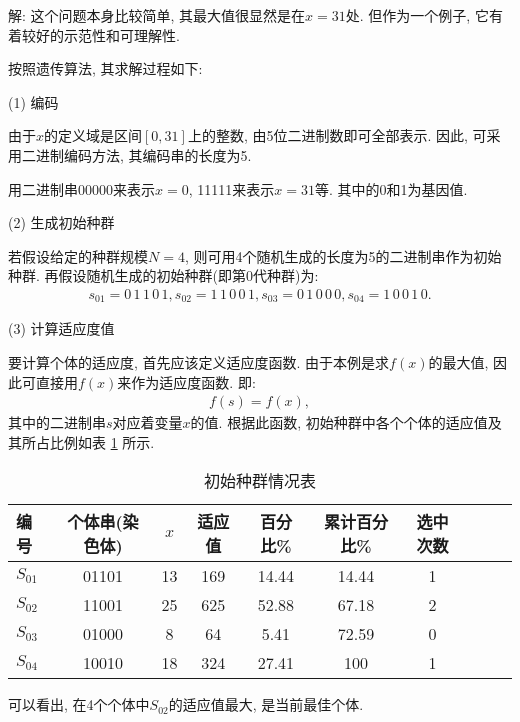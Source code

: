 解: 这个问题本身比较简单, 其最大值很显然是在$x=31$处. 但作为一个例子, 它有着较好的示范性和可理解性.

按照遗传算法, 其求解过程如下:

    (1) 编码

    由于$x$的定义域是区间$[0,31]$上的整数, 由5位二进制数即可全部表示. 因此, 可采用二进制编码方法, 其编码串的长度为5.

    \begin{example}
        用二进制串00000来表示$x=0$, 11111来表示$x=31$等. 其中的0和1为基因值.
    \end{example}

    (2) 生成初始种群

    若假设给定的种群规模$N=4$, 则可用4个随机生成的长度为5的二进制串作为初始种群. 再假设随机生成的初始种群(即第0代种群)为:
\begin{align*}
  s_{01}=0\,  1\,  1\,  0\,  1, s_{02}=1\,  1\,  0\,  0\,  1,  s_{03}=0\,  1\,  0\,  0\,  0,  s_{04}=1\,  0\,  0\,  1\,  0.
\end{align*}

 (3) 计算适应度值

要计算个体的适应度, 首先应该定义适应度函数. 由于本例是求$f(x)$的最大值, 因此可直接用$f(x)$来作为适应度函数. 即:
\begin{align*}
    f(s)=f(x),
\end{align*}
其中的二进制串$s$对应着变量$x$的值. 根据此函数, 初始种群中各个个体的适应值及其所占比例如表 \ref{AI_table2019112802} 所示.
\begin{table}[H]
\caption{初始种群情况表}
\vspace{-0.6cm}
\begin{center}
\begin{tabular} {lccccccccc}
  \hline
编号&个体串(染色体)&	$x$	&适应值&	百分比\%&	累计百分比\%&	选中次数\\
\hline
$S_{01}$&     01101&	13&	169&	14.44&	14.44&	1\\
$S_{02}$&	11001&	25&	625&	52.88&	67.18&	2\\
$S_{03}$&	01000&	8&	64&	5.41&	72.59&	0\\
$S_{04}$&	10010&	18&	324&	27.41&	100&	1\\
\hline
\end{tabular}
\end{center}
\label{AI_table2019112802}\vspace{-0.4cm}
\end{table}
可以看出, 在4个个体中$S_{02}$的适应值最大, 是当前最佳个体.

